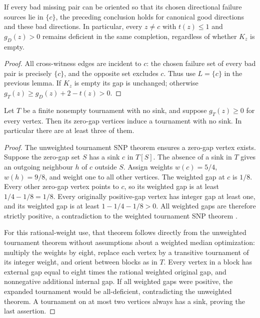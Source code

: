 \begin{lemma}
\label{lem:single-selected-source-completion}
If every bad missing pair can be oriented so that its chosen directional
failure sources lie in $\{c\}$, the preceding conclusion holds for
canonical good directions and these bad directions. In particular,
every $z\ne c$ with $t(z)\le1$ and $g_D(z)>0$ remains deficient in
the same completion, regardless of whether $K_z$ is empty.
\end{lemma}
\begin{proof}
All cross-witness edges are incident to $c$: the chosen failure set
of every bad pair is precisely $\{c\}$, and the opposite set excludes
$c$. Thus use $L=\{c\}$ in the previous lemma. If $K_z$ is empty its
gap is unchanged; otherwise $g_T(z)\ge g_D(z)+2-t(z)>0$.
\end{proof}

\begin{lemma}
\label{lem:nonnegative-tournament-three-zeros}
Let $T$ be a finite nonempty tournament with no sink, and suppose
$g_T(z)\ge0$ for every vertex. Then its zero-gap vertices induce a
tournament with no sink. In particular there are at least three of them.
\end{lemma}
\begin{proof}
The unweighted tournament SNP theorem ensures a zero-gap vertex exists.
Suppose the zero-gap set $S$ has a sink $c$ in $T[S]$.
The absence of a sink in $T$ gives an outgoing neighbour $h$ of $c$
outside $S$. Assign weights $w(c)=5/4$, $w(h)=9/8$, and weight one
to all other vertices. The weighted gap at $c$ is $1/8$.
Every other zero-gap vertex points to $c$, so its weighted gap is at
least $1/4-1/8=1/8$. Every originally positive-gap vertex has integer
gap at least one, and its weighted gap is at least $1-1/4-1/8>0$.
All weighted gaps are therefore strictly positive, a contradiction to
the weighted tournament SNP theorem \cite[Proposition~2.1]{FidlerYuster2007}.

For this rational-weight use, that theorem follows directly from the
unweighted tournament theorem without assumptions about a weighted
median optimization: multiply the weights by eight, replace each vertex
by a transitive tournament of its integer weight, and orient between
blocks as in $T$. Every vertex in a block has external gap equal to
eight times the rational weighted original gap, and nonnegative
additional internal gap.
If all weighted gaps were positive, the expanded tournament would be
all-deficient, contradicting the unweighted theorem.
A tournament on at most two vertices always has a sink, proving the
last assertion.
\end{proof}
